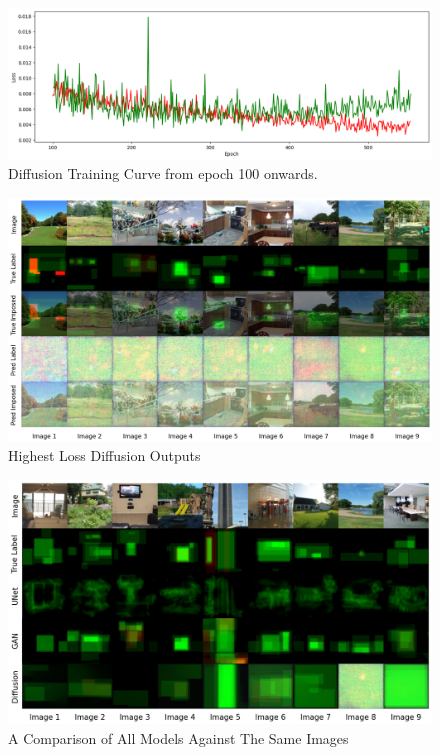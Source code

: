 \documentclass{UoYCSproject}
\begin{document}
\begin{figure}[ht]
    \centering
    \includegraphics[width=\linewidth]{Diffusion training curve overfit}
    \caption{Diffusion Training Curve from epoch 100 onwards.}
    \label{fig:DiffusionTrainingOverfit}
\end{figure}

\begin{figure}[ht]
    \centering
    \includegraphics[width=\linewidth]{Worst Diffusion Outputs}
    \caption{Highest Loss Diffusion Outputs}
    \label{fig:DiffusionWorstOutput}
\end{figure}

\begin{figure}[ht]
    \centering
    \includegraphics[width=\linewidth]{all models compared}
    \caption{A Comparison of All Models Against The Same Images}
    \label{fig:AllModelsCompared}
\end{figure}

\printbibliography
\end{document}
